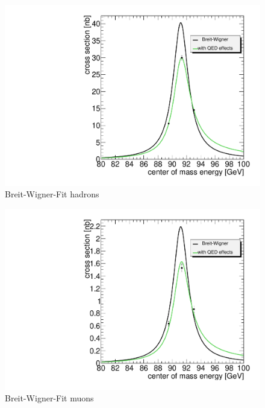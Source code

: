 \documentclass[epj,nopacs]{svjour}
\begin{document}
\begin{figure}[htb]
 \centering
 \includegraphics[width=1\columnwidth,keepaspectratio]{finalhad_fit}
 \caption{Breit-Wigner-Fit hadrons}
 \label{fig:e_vis}
\end{figure}

\begin{figure}[htb]
 \centering
 \includegraphics[width=1\columnwidth,keepaspectratio]{finalmu_fit}
 \caption{Breit-Wigner-Fit muons}
 \label{fig:n_cluster}
\end{figure}
\end{document}
